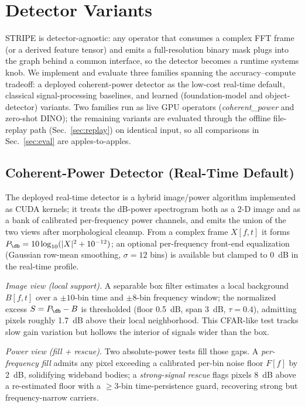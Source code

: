 \section{Detector Variants}
\label{sec:variants}

STRIPE is detector-agnostic: any operator that consumes a complex FFT frame (or a
derived feature tensor) and emits a full-resolution binary mask plugs into the graph
behind a common interface, so the detector becomes a runtime systems knob. We
implement and evaluate three families spanning the accuracy--compute tradeoff: a
deployed coherent-power detector as the low-cost real-time default, classical
signal-processing baselines, and learned (foundation-model and object-detector)
variants. Two families run as live GPU operators (\emph{coherent\_power} and
zero-shot DINO); the remaining variants are evaluated through the offline file-replay
path (Sec.~\ref{sec:replay}) on identical input, so all comparisons in
Sec.~\ref{sec:eval} are apples-to-apples.

\subsection{Coherent-Power Detector (Real-Time Default)}
\label{sec:coherent}

The deployed real-time detector is a hybrid image/power algorithm implemented as CUDA
kernels; it treats the dB-power spectrogram both as a 2-D image and as a bank of
calibrated per-frequency power channels, and emits the union of the two views after
morphological cleanup. From a complex frame $X[f,t]$ it forms
$P_{\db}=10\log_{10}(|X|^2+10^{-12})$; an optional per-frequency front-end
equalization (Gaussian row-mean smoothing, $\sigma=12$ bins) is available but clamped
to \SI{0}{dB} in the real-time profile.

\emph{Image view (local support).} A separable box filter estimates a local
background $B[f,t]$ over a $\pm10$-bin time and $\pm8$-bin frequency window; the
normalized excess $S=P_{\db}-B$ is thresholded (floor \SI{0.5}{dB}, span \SI{3}{dB},
$\tau=0.4$), admitting pixels roughly \SI{1.7}{dB} above their local neighborhood.
This CFAR-like test tracks slow gain variation but hollows the interior of signals
wider than the box.

\emph{Power view (fill + rescue).} Two absolute-power tests fill those gaps. A
\emph{per-frequency fill} admits any pixel exceeding a calibrated per-bin noise floor
$F[f]$ by \SI{2}{dB}, solidifying wideband bodies; a \emph{strong-signal rescue}
flags pixels \SI{8}{dB} above a re-estimated floor with a $\ge 3$-bin time-persistence
guard, recovering strong but frequency-narrow carriers.

